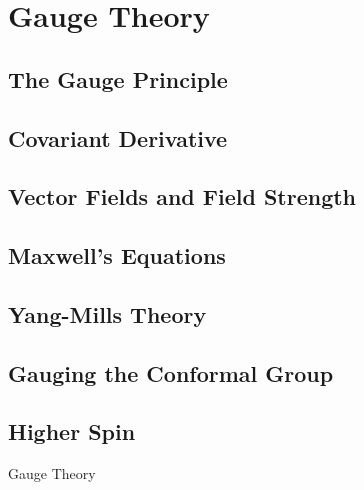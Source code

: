 \section{Gauge Theory}
\subsection{The Gauge Principle}
\subsection{Covariant Derivative}
\subsection{Vector Fields and Field Strength}
\subsection{Maxwell's Equations}
\subsection{Yang-Mills Theory}
\subsection{Gauging the Conformal Group}
\subsection{Higher Spin}

Gauge Theory